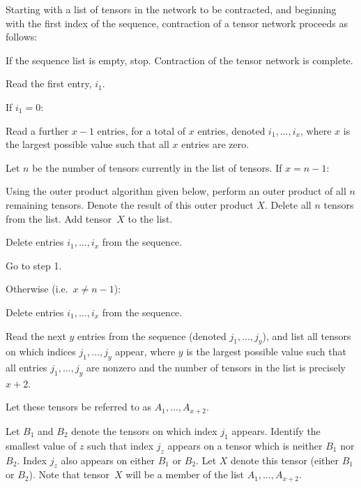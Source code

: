 Starting with a list of tensors in the network to be contracted, and beginning with the first index of the sequence, contraction of a tensor network proceeds as follows:
\begin{description}[align=left,font=\normalfont,itemsep=2pt]
\item[1] If the sequence list is empty, stop. Contraction of the tensor network is complete.
\item[2] Read the first entry, $i_1$. 
\item[3] If $i_1=0$:
\begin{description}[align=left,font=\normalfont,itemsep=2pt]
\item[3a] Read a further $x-1$ entries, for a total of $x$ entries, denoted $i_1,\ldots,i_x$, where $x$ is the largest possible value such that all $x$ entries are zero.
\item[3b] Let $n$ be the number of tensors currently in the list of tensors. If $x=n-1$:
\begin{description}[align=left,font=\normalfont,itemsep=2pt]
\item[3b1] Using the outer product algorithm given below, perform an outer product of all $n$ remaining tensors. Denote the result of this outer product $X$. Delete all $n$ tensors from the list. Add tensor~$X$ to the list.
\item[3b2] Delete entries $i_1,\ldots,i_x$ from the sequence.
\item[3b3] Go to step 1.
\end{description}
\item[3c] Otherwise (i.e.~$x\not=n-1$):
\begin{description}[align=left,font=\normalfont,itemsep=2pt]
\item[3c1] Delete entries $i_1,\ldots,i_x$ from the sequence.
\item[3c2] Read the next $y$ entries from the sequence (denoted $j_1,\ldots,j_y$), and list all tensors on which indices $j_1,\ldots,j_y$ appear, where $y$ is the largest possible value such that all entries $j_1,\ldots,j_y$ are nonzero and the number of tensors in the list is precisely $x+2$.
\item[3c3] Let these tensors be referred to as ${A}_1,\ldots,{A}_{x+2}$.
\item[3c4] Let ${B}_1$ and ${B}_2$ denote the tensors on which index $j_1$ appears. Identify the smallest value of $z$ such that index $j_z$ appears on a tensor which is neither ${B}_1$ nor ${B}_2$. Index $j_z$ also appears on either ${B}_1$ or ${B}_2$. Let $X$ denote this tensor (either ${B}_1$ or ${B}_2$). Note that tensor~$X$ will be a member of the list ${A}_1,\ldots,{A}_{x+2}$.

\end{description}
\end{description}
\end{description}
